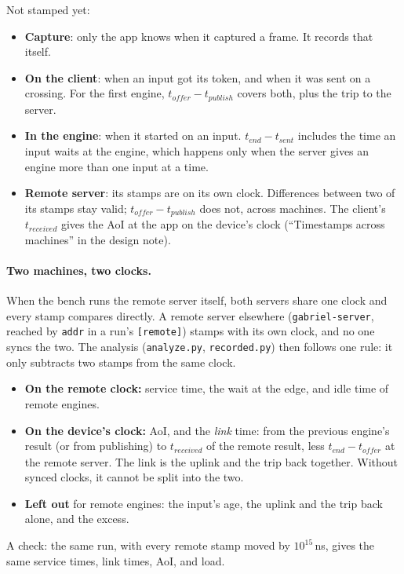 \documentclass[11pt]{article}
\newcommand{\code}[1]{\texttt{#1}}
\begin{document}
Not stamped yet:
\begin{itemize}[nosep]
  \item \textbf{Capture}: only the app knows when it captured a frame. It
        records that itself.
  \item \textbf{On the client}: when an input got its token, and when it was
        sent on a crossing. For the first engine, $t_\mathit{offer} -
        t_\mathit{publish}$ covers both, plus the trip to the server.
  \item \textbf{In the engine}: when it started on an input. $t_\mathit{end} -
        t_\mathit{sent}$ includes the time an input waits at the engine,
        which happens only when the server gives an engine more than one input
        at a time.
  \item \textbf{Remote server}: its stamps are on its own clock. Differences
        between two of its stamps stay valid; $t_\mathit{offer} -
        t_\mathit{publish}$ does not, across machines. The client's
        $t_\mathit{received}$ gives the AoI at the app on the device's clock
        (``Timestamps across machines'' in the design note).
\end{itemize}

\paragraph{Two machines, two clocks.} When the bench runs the remote server
itself, both servers share one clock and every stamp compares directly. A
remote server elsewhere (\code{gabriel-server}, reached by \code{addr} in a
run's \code{[remote]}) stamps with its own clock, and no one syncs the two.
The analysis (\code{analyze.py}, \code{recorded.py}) then follows one rule:
it only subtracts two stamps from the same clock.
\begin{itemize}[nosep]
  \item \textbf{On the remote clock:} service time, the wait at the edge,
        and idle time of remote engines.
  \item \textbf{On the device's clock:} AoI, and the \emph{link} time:
        from the previous engine's result (or from publishing) to
        $t_\mathit{received}$ of the remote result, less
        $t_\mathit{end} - t_\mathit{offer}$ at the remote server. The link
        is the uplink and the trip back together. Without synced clocks, it
        cannot be split into the two.
  \item \textbf{Left out} for remote engines: the input's age, the uplink and
        the trip back alone, and the excess.
\end{itemize}
A check: the same run, with every remote stamp moved by $10^{15}$\,ns,
gives the same service times, link times, AoI, and load.
\end{document}
